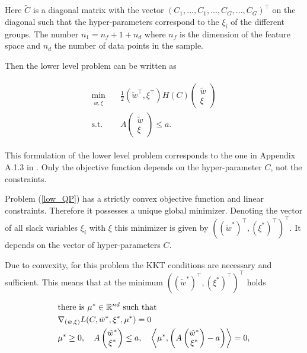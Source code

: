 Here \(\tilde{C}\) is a diagonal matrix with the vector \((C_1,...,C_1,...,C_G,...,C_G)^{\top}\) on the diagonal such that the hyper-parameters correspond to the \(\xi_i\) of the different groups. The number \(n_1 = n_f+1+n_d\) where \(n_f\) is the dimension of the feature space and \(n_d\) the number of data points in the sample.

Then the lower level problem can be written as

\begin{align}
\begin{split}
	\min_{\tilde{w},\xi} & \quad \frac{1}{2} (\tilde{w}^{\top},\xi^{\top}) H(C) \begin{pmatrix}\tilde{w}\\\xi\end{pmatrix} \\
	\text{s.t.} & \quad A \begin{pmatrix}\tilde{w}\\\xi\end{pmatrix} \leq a.
\end{split}
\label{low_QP}
\end{align}

This formulation of the lower level problem corresponds to the one in Appendix A.1.3 in \cite{Outrata1998}. Only the objective function depends on the hyper-parameter \(C\), not the constraints.

Problem (\ref{low_QP}) has a strictly convex objective function and linear constraints. Therefore it possesses a unique global minimizer. Denoting the vector of all slack variables \(\xi_i\) with \(\xi\) this minimizer is given by \(((\tilde{w}^*)^{\top},(\xi^*)^{\top})^{\top}\). It depends on the vector of hyper-parameters \(C\).

Due to convexity, for this problem the KKT conditions are necessary and sufficient. This means that at the minimum \(((\tilde{w}^*)^{\top},(\xi^*)^{\top})^{\top}\) holds

\begin{align*}
	& \text{there is } \mu^* \in \mathbb{R}^{nd} \text{ such that} \\
	&\nabla_{(\tilde{w},\xi)} L(C,\tilde{w}^*,\xi^*,\mu^*) = 0 \\
	& \mu^* \geq 0, \quad A \begin{pmatrix}\tilde{w}^*\\\xi^*\end{pmatrix} \leq a, \quad \left\langle\mu^*,\left(A \begin{pmatrix}\tilde{w}^*\\\xi^*\end{pmatrix} - a\right)\right\rangle = 0,
\end{align*}

